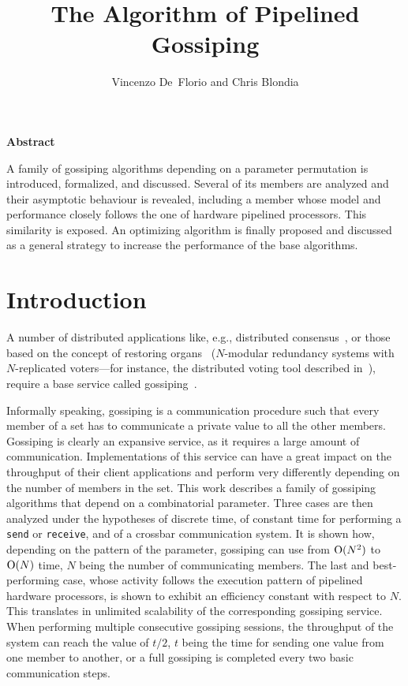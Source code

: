 \documentclass{elsart}
\begin{document}
\begin{frontmatter}
\title{The Algorithm of Pipelined Gossiping}
\author{Vincenzo De~Florio and Chris Blondia}
\address{University of Antwerp\\
 Department of Mathematics and Computer Science\\
 Performance Analysis of Telecommunication Systems group\\
 Middelheimlaan 1, 2020 Antwerp, Belgium, \emph{and}\\
 Interdisciplinary institute for BroadBand Technology\\
 Crommenlaan 8, 9050 Ghent-Ledeberg, Belgium.}
\end{frontmatter}

\noindent
\centerline{\bf Abstract}

\noindent
A family of gossiping algorithms depending on a parameter permutation
is introduced, formalized, and discussed. Several of its members
are analyzed and their asymptotic behaviour is revealed, including
a member whose model and performance closely follows the one of
hardware pipelined processors. This similarity is exposed. An optimizing
algorithm is finally proposed and discussed as 
a general strategy to increase the
performance of the base algorithms.


\section{Introduction}
A number of distributed applications like, e.g.,
distributed consensus~\cite{LaSP82}, or those based on the concept
of restoring organs~\cite{DeDL00c,John89a} ($N$-modular redundancy systems
with $N$-replicated voters---for instance, the distributed voting
tool described in~\cite{DeDL98e}),
require a base service called gossiping~\cite{Goss,BGRV98,Gon03}.

Informally speaking, gossiping is a communication procedure such that
every member of a set has to communicate a private value to all
the other members. Gossiping is clearly an expansive service,
as it requires a large amount of communication. Implementations
of this service can have a great impact on the throughput
of their client applications and perform very differently
depending on the number of members in the set.
This work describes a family of gossiping algorithms that
depend on a combinatorial parameter.
Three cases are then analyzed under the hypotheses of discrete
time, of constant time for performing a \verb"send" or
\verb"receive", and of a crossbar communication system.
It is shown how, depending on the pattern of the parameter,
gossiping can use from $\hbox{O}(N^2)$ to $\hbox{O}(N)$ time,
$N$ being the number of communicating members.
The last and best-performing case, whose activity follows the
execution pattern of pipelined hardware processors, is shown
to exhibit an efficiency constant with respect to $N$.
This translates in unlimited scalability of the corresponding
gossiping service. When performing multiple consecutive gossiping
sessions, the throughput of the system can reach the value
of $t/2$, $t$ being the time for sending one value from
one member to another, or a full gossiping is completed
every two basic communication steps.
\end{document}
